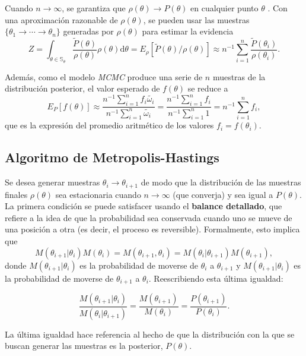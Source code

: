 	Cuando $n\rightarrow\infty$, se garantiza que $\rho(\theta)\rightarrow P(\theta)$ en cualquier punto $\theta$ \cite{brooks_gelman_jones_2011}. Con una aproximación razonable de $\rho(\theta)$, se pueden usar las muestras $\{\theta_1\rightarrow\cdots\rightarrow\theta_n\}$ generadas por $\rho(\theta)$ para estimar la evidencia
	$$Z=\int_{\theta\in\mathbb{S}_\theta}\frac{\tilde{P}(\theta)}{\rho(\theta)}\rho(\theta)\mathrm{d}\theta =E_\rho[\tilde{P}(\theta)/\rho(\theta)]\approx n^{-1}\sum_{i=1}^n \frac{\tilde{P}(\theta_i)}{\rho(\theta_i)}.$$
	
	Además, como el modelo \textit{MCMC} produce una serie de $n$ muestras de la distribución posterior, el valor esperado de $f(\theta)$ se reduce a
	$$E_P[f(\theta)]\approx\frac{n^{-1}\sum_{i=1}^n f_i\tilde{\omega_i}}{n^{-1}\sum_{i=1}^n \tilde{\omega_i}}=\frac{n^{-1}\sum_{i=1}^n f_i}{n^{-1}\sum_{i=1}^n 1}=n^{-1}\sum_{i=1}^n f_i,$$
	que es la expresión del promedio aritmético de los valores $f_i=f(\theta_i).$
	
	\subsection{Algoritmo de Metropolis-Hastings}
	Se desea generar muestras $\theta_i\rightarrow\theta_{i+1}$ de modo que la distribución de las muestras finales $\rho(\theta)$ sea estacionaria cuando $n\rightarrow\infty$ (que converja) y sea igual a $P(\theta)$. La primera condición se puede satisfacer usando el \textbf{balance detallado}, que refiere a la idea de que la probabilidad sea conservada cuando uno se mueve de una posición a otra (es decir, el proceso es reversible). Formalmente, esto implica que
	$$M(\theta_{i+1}|\theta_i)M(\theta_i)=M(\theta_{i+1},\theta_{i})=M(\theta_i|\theta_{i+1})M(\theta_{i+1}),$$
	donde $M(\theta_{i+1}|\theta_i)$ es la probabilidad de moverse de $\theta_i$ a $\theta_{i+1}$ y $M(\theta_{i+1}|\theta_i)$ es la probabilidad de moverse de $\theta_{i+1}$ a $\theta_i$. Reescribiendo esta última igualdad:
	
	\begin{equation}\label{eq:detailedBalance}
	\frac{M(\theta_{i+1}|\theta_i)}{M(\theta_{i}|\theta_{i+1})}=\frac{M(\theta_{i+1})}{M(\theta_i)}=\frac{P(\theta_{i+1})}{P(\theta_i)}.
	\end{equation}
	
	La última igualdad hace referencia al hecho de que la distribución con la que se buscan generar las muestras es la posterior, $P(\theta)$.
	
